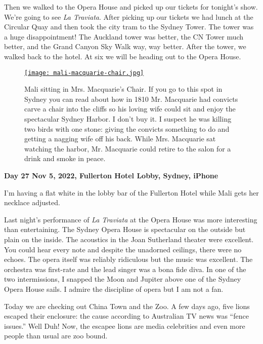 Then we walked to the Opera House and picked up our tickets for
tonight's show. We're going to see \emph{La Traviata}. After picking up
our tickets we had lunch at the Circular Quay and then took the city
tram to the Sydney Tower. The tower was a huge disappointment! The
Auckland tower was better, the CN Tower much better, and the Grand
Canyon Sky Walk way, way better. After the tower, we walked back to the
hotel. At six we will be heading out to the Opera House.


\captionsetup[figure]{labelformat=empty}
\begin{SCfigure}[20]
 \centering
\href{https://conceptcontrol.smugmug.com/Trips/Overseas/Australia-New-Zealand-2022/i-S2hzjsV/A}{\texttt{[image: mali-macquarie-chair.jpg]}}
\caption[Mali sitting in Mrs. Macquarie's Chair]{Mali sitting in Mrs. Macquarie's Chair. If you go to this spot
in Sydney you can read about how in 1810 Mr. Macquarie had convicts
carve a chair into the cliffs so his loving wife could sit and enjoy the
spectacular Sydney Harbor. I don't buy it. I suspect he was killing two
birds with one stone: giving the convicts something to do and getting a
nagging wife off his back. While Mrs. Macquarie sat watching the harbor,
Mr. Macquarie could retire to the salon for a drink and smoke in peace.}
\label{fig:7627x2}
\end{SCfigure}

\textbf{Day 27 Nov 5, 2022, Fullerton Hotel Lobby, Sydney, iPhone}

I'm having a flat white in the lobby bar of the Fullerton Hotel while Mali
gets her necklace adjusted.

Last night's performance of \emph{La Traviata} at the Opera House was
more interesting than entertaining. The Sydney Opera House is
spectacular on the outside but plain on the inside. The acoustics in the
Joan Sutherland theater were excellent. You could hear every note and
despite the unadorned ceilings, there were no echoes. The opera itself
was reliably ridiculous but the music was excellent. The orchestra was
first-rate and the lead singer was a bona fide diva. In one of the two
intermissions, I snapped the Moon and Jupiter above one of the Sydney
Opera House sails. I admire the discipline of opera but I am not a fan.

Today we are checking out China Town and the Zoo. A few days ago, five
lions escaped their enclosure: the cause according to Australian TV news
was ``fence issues.'' Well Duh! Now, the escapee lions are media
celebrities and even more people than usual are zoo bound.

